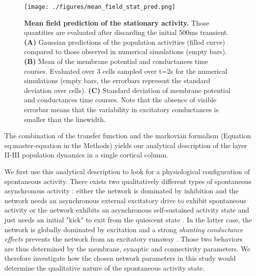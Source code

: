 \documentclass[8pt, colorlinks, a4paper]{article}
\renewcommand\ref{}
\begin{document}
\begin{figure}[tb!]
\centering
\texttt{[image: ./figures/mean\_field\_stat\_pred.png]}
\caption{\label{fig:mf-stat-pred}\textbf{Mean field prediction of the
    stationary activity.} Those quantities are evaluated after
  discarding the initial 500ms transient. \textbf{(A)} Gaussian
  predictions of the population activities (filled curve) compared to
  those observed in numerical simulations (empty bars). \textbf{(B)}
  Mean of the membrane potential and conductances time
  courses. Evaluated over 3 cells sampled over t=2s for the numerical
  simulations (empty bars, the errorbars represent the standard
  deviation over cells). \textbf{(C)} Standard deviation of membrane
  potential and conductances time courses. Note that the absence of
  visible errorbar means that the variability in excitatory
  conductances is smaller than the linewidth.}
\end{figure}

The combination of the transfer function and the markovian formalism
(Equation \ref{eq:master-equation} in the Methods) yields our analytical
description of the layer II-III population dynamics in a single
cortical column.

We first use this analytical description to look for a physiological
configuration of spontaneous activity. There exists two qualitatively
different types of spontaneous asynchronous activity
\cite{Vogels2005,Kumar2008}: either the network is dominated by
inhibition and the network needs an asynchronous external excitatory
drive to exhibit spontaneous activity \cite{Amit1997,Brunel2000} or
the network exhibits an asynchronous self-sustained activity state and
just needs an initial "kick" to exit from the quiescent state
\cite{Vogels2005,Kumar2008,ElBoustani2009}. In the latter case, the
network is globally dominated by excitation and a strong
\emph{shunting conductance effects} prevents the network from an
excitatory runaway \cite{Kuhn2004,Kumar2008}. Those two behaviors are
thus determined by the membrane, synaptic and connectivity
parameters. We therefore investigate how the chosen network parameters
in this study would determine the qualitative nature of the
spontaneous activity state.
\end{document}

